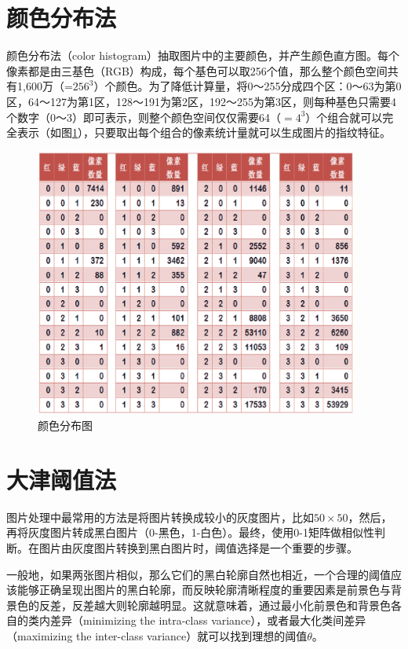 \section{颜色分布法}
颜色分布法（color histogram）抽取图片中的主要颜色，并产生颜色直方图。每个像素都是由三基色（RGB）构成，每个基色可以取256个值，那么整个颜色空间共有1,600万（=$256^3$）个颜色。为了降低计算量，将0～255分成四个区：0～63为第0区，64～127为第1区，128～191为第2区，192～255为第3区，则每种基色只需要4个数字（0～3）即可表示，则整个颜色空间仅仅需要64（$=4^3$）个组合就可以完全表示（如图\ref{fig:colordistribution}），只要取出每个组合的像素统计量就可以生成图片的指纹特征。
\begin{figure}[htbp]
  \centering
  \includegraphics[width=0.95\textwidth]{figures/colordistribution.eps}
  \caption{颜色分布图}\label{fig:colordistribution}
\end{figure}

\section{大津阈值法}
图片处理中最常用的方法是将图片转换成较小的灰度图片，比如$50\times 50$，然后，再将灰度图片转成黑白图片（0-黑色，1-白色）。最终，使用0-1矩阵做相似性判断。在图片由灰度图片转换到黑白图片时，阈值选择是一个重要的步骤。

一般地，如果两张图片相似，那么它们的黑白轮廓自然也相近，一个合理的阈值应该能够正确呈现出图片的黑白轮廓，而反映轮廓清晰程度的重要因素是前景色与背景色的反差，反差越大则轮廓越明显。这就意味着，通过最小化前景色和背景色各自的类内差异（minimizing the intra-class variance），或者最大化类间差异（maximizing the inter-class variance）就可以找到理想的阈值$\theta$。


